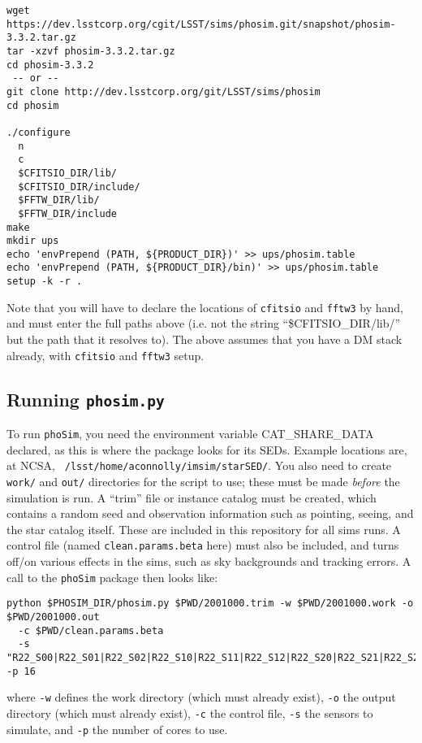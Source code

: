 \documentclass[prd, nofootinbib, floatfix, 11pt, tightenlines, times]{article}
\begin{document}
\begin{appendices}
{\small
\begin{Verbatim}[frame=single]
wget https://dev.lsstcorp.org/cgit/LSST/sims/phosim.git/snapshot/phosim-3.3.2.tar.gz
tar -xzvf phosim-3.3.2.tar.gz
cd phosim-3.3.2
 -- or --
git clone http://dev.lsstcorp.org/git/LSST/sims/phosim
cd phosim

./configure
  n
  c
  $CFITSIO_DIR/lib/
  $CFITSIO_DIR/include/
  $FFTW_DIR/lib/
  $FFTW_DIR/include
make
mkdir ups
echo 'envPrepend (PATH, ${PRODUCT_DIR})' >> ups/phosim.table
echo 'envPrepend (PATH, ${PRODUCT_DIR}/bin)' >> ups/phosim.table
setup -k -r .
\end{Verbatim}
}  

Note that you will have to declare the locations of {\tt cfitsio} and
{\tt fftw3} by hand, and must enter the full paths above (i.e. not the
string ``\$CFITSIO\_DIR/lib/'' but the path that it resolves to).  The
above assumes that you have a DM stack already, with {\tt cfitsio} and
{\tt fftw3} setup.

\subsection{Running {\tt phosim.py}}

To run {\tt phoSim}, you need the environment variable
CAT\_SHARE\_DATA declared, as this is where the package looks for its
SEDs.  Example locations are, at NCSA, {\tt
  /lsst/home/aconnolly/imsim/starSED/}.  You also need to create {\tt
  work/} and {\tt out/} directories for the script to use; these must
be made {\it before} the simulation is run.  A ``trim'' file or
instance catalog must be created, which contains a random seed and
observation information such as pointing, seeing, and the star catalog
itself.  These are included in this repository for all sims runs.  A
control file (named {\tt clean.params.beta} here) must also be
included, and turns off/on various effects in the sims, such as sky
backgrounds and tracking errors.  A call to the {\tt phoSim} package
then looks like: 

{\small
\begin{Verbatim}[frame=single]
python $PHOSIM_DIR/phosim.py $PWD/2001000.trim -w $PWD/2001000.work -o $PWD/2001000.out 
  -c $PWD/clean.params.beta 
  -s "R22_S00|R22_S01|R22_S02|R22_S10|R22_S11|R22_S12|R22_S20|R22_S21|R22_S22" -p 16
\end{Verbatim}
} 
where {\tt -w} defines the work directory (which must already exist),
{\tt -o} the output directory (which must already exist), {\tt -c} the
control file, {\tt -s} the sensors to simulate, and {\tt -p} the
number of cores to use.



\end{appendices}
\end{document}
